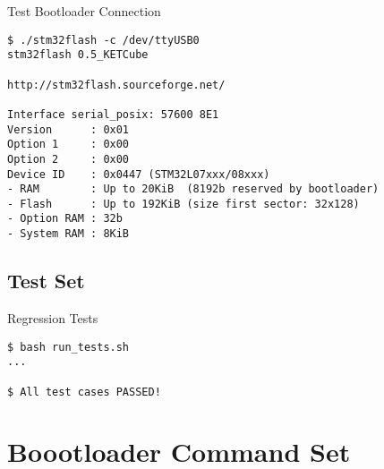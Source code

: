 \begin{docCodeExampleTitled}{Test Bootloader Connection}
\begin{verbatim}
$ ./stm32flash -c /dev/ttyUSB0 
stm32flash 0.5_KETCube

http://stm32flash.sourceforge.net/

Interface serial_posix: 57600 8E1
Version      : 0x01
Option 1     : 0x00
Option 2     : 0x00
Device ID    : 0x0447 (STM32L07xxx/08xxx)
- RAM        : Up to 20KiB  (8192b reserved by bootloader)
- Flash      : Up to 192KiB (size first sector: 32x128)
- Option RAM : 32b
- System RAM : 8KiB
\end{verbatim}
\end{docCodeExampleTitled}

\subsection{Test Set}

\begin{docCodeExampleTitled}{Regression Tests}
\begin{verbatim}
$ bash run_tests.sh
...

$ All test cases PASSED!
\end{verbatim}
\end{docCodeExampleTitled}

\clearpage
\section{Boootloader Command Set}

